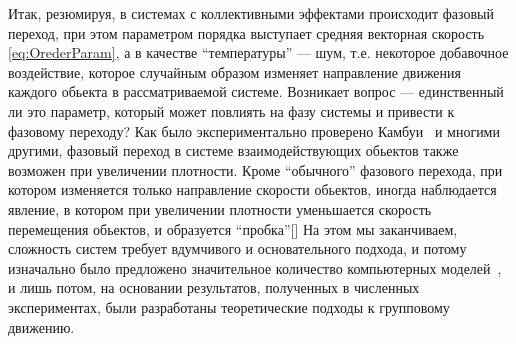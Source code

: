     Итак, резюмируя, в системах с коллективными эффектами происходит фазовый переход, при этом параметром порядка выступает средняя векторная скорость \ref{eq:OrederParam}, а в качестве ``температуры'' --- шум, т.е. некоторое добавочное воздействие, которое случайным образом изменяет направление движения каждого обьекта в рассматриваемой системе. Возникает вопрос --- единственный ли это параметр, который может повлиять на фазу системы и привести к фазовому переходу? Как было экспериментально проверено Камбуи~\cite{cambui2012} и многими другими, фазовый переход в системе взаимодействующих обьектов также возможен при увеличении плотности. Кроме ``обычного'' фазового перехода, при котором изменяется только направление скорости обьектов, иногда наблюдается явление, в котором при увеличении плотности уменьшается скорость перемещения обьектов, и образуется ``пробка''[] 
    На этом мы заканчиваем, сложность систем требует вдумчивого и основательного подхода, и потому изначально было предложено значительное количество компьютерных моделей~\cite{reynolds1987,vicsek1995,gregoire2004,nagy2007,schubring2013}, и лишь потом, на основании результатов, полученных в численных экспериментах, были разработаны теоретические подходы к групповому движению.~\cite{tu2000,kulinskii2005,bertin2006,ratushnaya2007,vicsek2007,chepizhko2013,kulinskii2014}